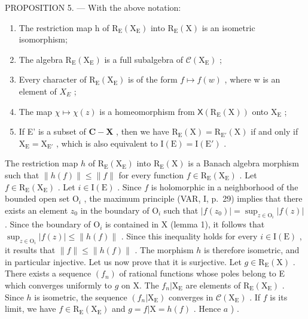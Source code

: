 PROPOSITION 5. --- With the above notation:

\begin{enumerate}
\def\labelenumi{\alph{enumi})}
\item
  The restriction map h of \(\mathrm{R}_{\mathrm{E}}(\mathrm{X}_{\mathrm{E}})\) into \(\mathrm{R}_{\mathrm{E}}(\mathrm{X})\) is an isometric isomorphism;
\item
  The algebra \(\mathrm{R}_{\mathrm{E}}(\mathrm{X}_{\mathrm{E}})\) is a full subalgebra of \(\mathcal{C}(\mathrm{X}_{\mathrm{E}})\) ;
\item
  Every character of \(\mathrm{R}_{\mathrm{E}}(\mathrm{X}_{\mathrm{E}})\) is of the form \(f \mapsto f(w)\) , where w is an element of \(X_{E}\) ;
\item
  The map \(\chi \mapsto \chi (z)\) is a homeomorphism from \(\mathsf{X}(\mathrm{R}_{\mathrm{E}}(\mathrm{X}))\) onto \(\mathrm{X}_{\mathrm{E}}\) ;
\item
  If E' is a subset of \(\mathbf{C} - \mathbf{X}\) , then we have \(\mathrm{R}_{\mathrm{E}}(\mathrm{X}) = \mathrm{R}_{\mathrm{E}'}(\mathrm{X})\) if and only if \(\mathrm{X}_{\mathrm{E}} = \mathrm{X}_{\mathrm{E}'}\) , which is also equivalent to \(\mathrm{I}(\mathrm{E}) = \mathrm{I}(\mathrm{E}')\) .
\end{enumerate}

The restriction map \(h\) of \(\mathrm{R}_{\mathrm{E}}(\mathrm{X}_{\mathrm{E}})\) into \(\mathrm{R}_{\mathrm{E}}(\mathrm{X})\) is a Banach algebra morphism such that \(\| h(f)\| \leqslant \| f\|\) for every function \(f\in \mathrm{R}_{\mathrm{E}}(\mathrm{X}_{\mathrm{E}})\) . Let \(f\in \mathrm{R}_{\mathrm{E}}(\mathrm{X}_{\mathrm{E}})\) . Let \(i\in \mathrm{I}(\mathrm{E})\) . Since \(f\) is holomorphic in a neighborhood of the bounded open set \(\mathrm{O}_i\) , the maximum principle (VAR, I, p.~29) implies that there exists an element \(z_0\) in the boundary of \(\mathrm{O}_i\) such that \(|f(z_0)| = \sup_{z\in \mathrm{O}_i}|f(z)|\) . Since the boundary of \(\mathrm{O}_i\) is contained in X (lemma 1), it follows that \(\sup_{z\in \mathrm{O}_i}|f(z)|\leqslant \| h(f)\|\) . Since this inequality holds for every \(i\in \mathrm{I}(\mathrm{E})\) , it results that \(\| f\| \leqslant \| h(f)\|\) . The morphism \(h\) is therefore isometric, and in particular injective. Let us now prove that it is surjective. Let \(g\in \mathrm{R}_{\mathrm{E}}(\mathrm{X})\) . There exists a sequence \((f_n)\) of rational functions whose poles belong to E which converges uniformly to \(g\) on X. The \(f_n|\mathrm{X}_{\mathrm{E}}\) are elements of \(\mathrm{R}_{\mathrm{E}}(\mathrm{X}_{\mathrm{E}})\) . Since \(h\) is isometric, the sequence \((f_n|\mathrm{X}_{\mathrm{E}})\) converges in \(\mathcal{C}(\mathrm{X}_{\mathrm{E}})\) . If \(f\) is its limit, we have \(f\in \mathrm{R}_{\mathrm{E}}(\mathrm{X}_{\mathrm{E}})\) and \(g = f|\mathrm{X} = h(f)\) . Hence \(a\) ) .

